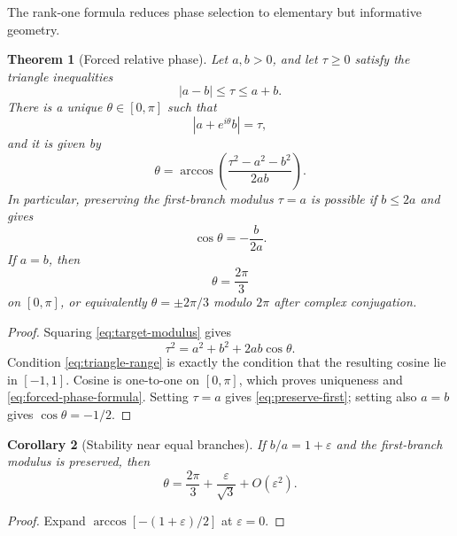 \documentclass[11pt]{article}
\newtheorem{theorem}{Theorem}[section]
\newtheorem{corollary}[theorem]{Corollary}
\theoremstyle{definition}
\theoremstyle{remark}
\begin{document}
The rank-one formula reduces phase selection to elementary but informative
geometry.

\begin{theorem}[Forced relative phase]
\label{thm:forced-phase}
Let $a,b>0$, and let $\tau\ge0$ satisfy the triangle inequalities
\begin{equation}\label{eq:triangle-range}
 |a-b|\le\tau\le a+b.
\end{equation}
There is a unique $\theta\in[0,\pi]$ such that
\begin{equation}\label{eq:target-modulus}
 |a+e^{i\theta}b|=\tau,
\end{equation}
and it is given by
\begin{equation}\label{eq:forced-phase-formula}
 \boxed{
 \theta=\arccos\!\left(
 \frac{\tau^2-a^2-b^2}{2ab}
 \right).}
\end{equation}
In particular, preserving the first-branch modulus $\tau=a$ is possible if
$b\le2a$ and gives
\begin{equation}\label{eq:preserve-first}
 \cos\theta=-\frac{b}{2a}.
\end{equation}
If $a=b$, then
\begin{equation}\label{eq:cubic-phase}
 \boxed{\theta=\frac{2\pi}{3}}
\end{equation}
on $[0,\pi]$, or equivalently
$\theta=\pm2\pi/3$ modulo $2\pi$ after complex conjugation.
\end{theorem}

\begin{proof}
Squaring \eqref{eq:target-modulus} gives
\[
 \tau^2=a^2+b^2+2ab\cos\theta.
\]
Condition \eqref{eq:triangle-range} is exactly the condition that the
resulting cosine lie in $[-1,1]$.  Cosine is one-to-one on $[0,\pi]$, which
proves uniqueness and \eqref{eq:forced-phase-formula}.  Setting $\tau=a$
gives \eqref{eq:preserve-first}; setting also $a=b$ gives
$\cos\theta=-1/2$.
\end{proof}

\begin{corollary}[Stability near equal branches]
\label{cor:phase-stability}
If $b/a=1+\varepsilon$ and the first-branch modulus is preserved, then
\begin{equation}\label{eq:phase-expansion}
 \theta=\frac{2\pi}{3}+\frac{\varepsilon}{\sqrt3}
 +O(\varepsilon^2).
\end{equation}
\end{corollary}

\begin{proof}
Expand $\arccos[-(1+\varepsilon)/2]$ at $\varepsilon=0$.
\end{proof}
\end{document}
